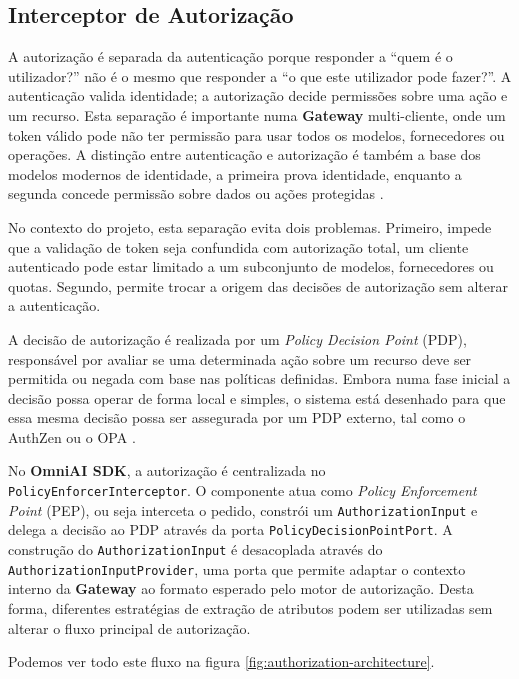 \subsection{Interceptor de Autorização}
A autorização é separada da autenticação porque responder a ``quem é o utilizador?'' não é o mesmo que responder a ``o que este utilizador pode fazer?''. A autenticação valida identidade; a autorização decide permissões sobre uma ação e um recurso. Esta separação é importante numa \textbf{Gateway} multi-cliente, onde um token válido pode não ter permissão para usar todos os modelos, fornecedores ou operações. A distinção entre autenticação e autorização é também a base dos modelos modernos de identidade, a primeira prova identidade, enquanto a segunda concede permissão sobre dados ou ações protegidas \cite{microsoft_authn_authz}.

No contexto do projeto, esta separação evita dois problemas. Primeiro, impede que a validação de token seja confundida com autorização total, um cliente autenticado pode estar limitado a um subconjunto de modelos, fornecedores ou quotas. Segundo, permite trocar a origem das decisões de autorização sem alterar a autenticação.

A decisão de autorização é realizada por um \textit{Policy Decision Point} (PDP), responsável por avaliar se uma determinada ação sobre um recurso deve ser permitida ou negada com base nas políticas definidas. Embora numa fase inicial a decisão possa operar de forma local e simples, o sistema está desenhado para que essa mesma decisão possa ser assegurada por um PDP externo, tal como o AuthZen \cite{ref_authZen} ou o OPA \cite{ref_OPA}. 

No \textbf{OmniAI SDK}, a autorização é centralizada no \texttt{Policy\allowbreak Enforcer\allowbreak Interceptor}. O componente atua como \textit{Policy Enforcement Point} (PEP), ou seja interceta o pedido, constrói um \texttt{Authorization\allowbreak Input} e delega a decisão ao PDP através da porta \texttt{Policy\allowbreak Decision\allowbreak Point\allowbreak Port}. A construção do \texttt{Authorization\allowbreak Input} é desacoplada através do \texttt{Authorization\allowbreak Input\allowbreak Provider}, uma porta que permite adaptar o contexto interno da \textbf{Gateway} ao formato esperado pelo motor de autorização. Desta forma, diferentes estratégias de extração de atributos podem ser utilizadas sem alterar o fluxo principal de autorização.

Podemos ver todo este fluxo na figura \ref{fig:authorization-architecture}.


